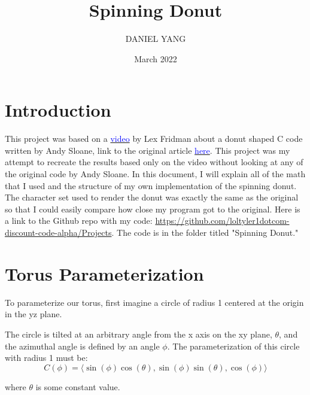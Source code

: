 \documentclass{article}
\title{Spinning Donut}
\author{DANIEL YANG}
\date{March 2022}
\begin{document}
\maketitle

\section{Introduction}
\begin{flushleft}
This project was based on a \href{https://www.youtube.com/watch?v=DEqXNfs_HhY} {\textcolor{blue}{video}} by Lex Fridman about a donut shaped C code written by Andy Sloane, link to the original article \href{https://www.a1k0n.net/2011/07/20/donut-math.html}{\textcolor{blue}{here}}. This project was my attempt to recreate the results based only on the video without looking at any of the original code by Andy Sloane. In this document, I will explain all of the math that I used and the structure of my own implementation of the spinning donut. The character set used to render the donut was exactly the same as the original so that I could easily compare how close my program got to the original. Here is a link to the Github repo with my code: \url{https://github.com/loltyler1dotcom-discount-code-alpha/Projects}. The code is in the folder titled "Spinning Donut."
\end{flushleft}

\section{Torus Parameterization}
\begin{flushleft}
To parameterize our torus, first imagine a circle of radius 1 centered at the origin in the yz plane.
\end{flushleft}
\centering
{}

\begin{flushleft}
The circle is tilted at an arbitrary angle from the x axis on the xy plane, $\theta$, and the azimuthal angle is defined by an angle $\phi$. The parameterization of this circle with radius 1 must be: $$C(\phi)=\langle \sin(\phi)\cos(\theta),\sin(\phi)\sin(\theta),\cos(\phi) \rangle$$

where $\theta$ is some constant value. \\
\end{flushleft}
\end{document}
